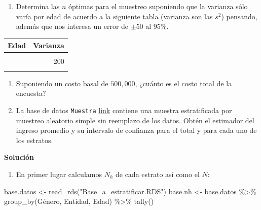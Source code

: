 \documentclass[
]{book}
\newenvironment{Shaded}{\begin{snugshade}}{\end{snugshade}}
\newcommand{\FunctionTok}[1]{\textcolor[rgb]{0.00,0.00,0.00}{#1}}
\newcommand{\NormalTok}[1]{#1}
\newcommand{\OtherTok}[1]{\textcolor[rgb]{0.56,0.35,0.01}{#1}}
\newcommand{\SpecialCharTok}[1]{\textcolor[rgb]{0.00,0.00,0.00}{#1}}
\newcommand{\StringTok}[1]{\textcolor[rgb]{0.31,0.60,0.02}{#1}}
\providecommand{\tightlist}{%
  \setlength{\itemsep}{0pt}\setlength{\parskip}{0pt}}
\begin{document}
\begin{enumerate}
\def\labelenumi{\arabic{enumi}.}
\tightlist
\item
  Determina las \(n\) óptimas para el muestreo suponiendo que la varianza sólo varía por edad de acuerdo a la siguiente tabla (varianza son las \(s^2\)) pensando, además que nos interesa un error de \(\pm 50\) al \(95\%\).
\end{enumerate}

\begin{table}
\centering
\begin{tabular}{l|r}
\hline
Edad & Varianza\\
\hline
\cellcolor{gray!6}{< 20} & \cellcolor{gray!6}{100}\\
\hline
[20,60] & 200\\
\hline
\cellcolor{gray!6}{>60} & \cellcolor{gray!6}{500}\\
\hline
\end{tabular}
\end{table}

\begin{enumerate}
\def\labelenumi{\arabic{enumi}.}
\setcounter{enumi}{1}
\item
  Suponiendo un costo basal de \(500,000\), ¿cuánto es el costo total de la encuesta?
\item
  La base de datos \texttt{Muestra} \href{https://www.dropbox.com/s/jy0cq596i810brt/Muestra_estratificada.RDS?dl=0}{link} contiene una muestra estratificada por muestreo aleatorio simple sin reemplazo de los datos. Obtén el estimador del ingreso promedio y su intervalo de confianza para el total y para cada uno de los estratos.
\end{enumerate}

\textbf{Solución}

\begin{enumerate}
\def\labelenumi{\arabic{enumi}.}
\tightlist
\item
  En primer lugar calculamos \(N_h\) de cada estrato así como el \(N\):
\end{enumerate}

\begin{Shaded}
\begin{Highlighting}[]
\NormalTok{base.datos }\OtherTok{\textless{}{-}} \FunctionTok{read\_rds}\NormalTok{(}\StringTok{"Base\_a\_estratificar.RDS"}\NormalTok{)}
\NormalTok{base.nh    }\OtherTok{\textless{}{-}}\NormalTok{ base.datos }\SpecialCharTok{\%\textgreater{}\%} \FunctionTok{group\_by}\NormalTok{(Género, Entidad, Edad) }\SpecialCharTok{\%\textgreater{}\%} \FunctionTok{tally}\NormalTok{()}
\end{Highlighting}
\end{Shaded}
\end{document}
